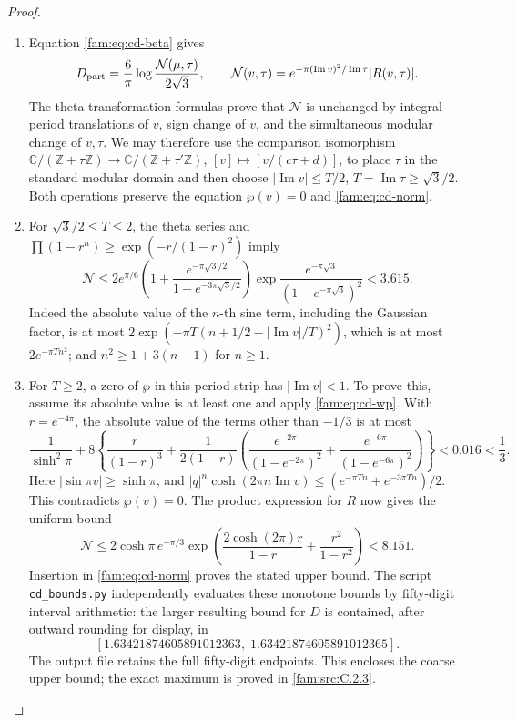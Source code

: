 \begin{proof}
\begin{enumerate}[label=\arabic*.,leftmargin=*]
\item Equation \eqref{fam:eq:cd-beta} gives
\begin{equation}\label{fam:eq:cd-norm}
 D_{\rm part}=\frac6\pi\log\frac{\mathcal N(\mu,\tau)}{2\sqrt3},
 \qquad
 \mathcal N(v,\tau)=e^{-\pi(\operatorname{Im}v)^2/\operatorname{Im}\tau}
 |R(v,\tau)|.
\end{equation}
The theta transformation formulas prove that \(\mathcal N\) is unchanged
by integral period translations of \(v\), sign change of \(v\), and the
simultaneous modular change of \(v,\tau\). We may therefore use the
comparison isomorphism \(\mathbb C/(\mathbb Z+\tau\mathbb Z)\to
\mathbb C/(\mathbb Z+\tau'\mathbb Z)\), \([v]\mapsto[v/(c\tau+d)]\), to
place \(\tau\) in the standard modular domain and then choose
\(|\operatorname{Im}v|\leq T/2\), \(T=\operatorname{Im}\tau\geq\sqrt3/2\).
Both operations preserve the equation \(\wp(v)=0\) and \eqref{fam:eq:cd-norm}.

\item For \(\sqrt3/2\leq T\leq2\), the theta series and
\(\prod(1-r^n)\geq\exp(-r/(1-r)^2)\) imply
\[
 \mathcal N\leq
 2e^{\pi/6}\left(1+\frac{e^{-\pi\sqrt3/2}}
 {1-e^{-3\pi\sqrt3/2}}\right)
 \exp\frac{e^{-\pi\sqrt3}}{(1-e^{-\pi\sqrt3})^2}
 <3.615.
\]
Indeed the absolute value of the \(n\)-th sine term, including the
Gaussian factor, is at most
\(2\exp(-\pi T(n+1/2-|\operatorname{Im}v|/T)^2)\), which is at most
\(2e^{-\pi Tn^2}\); and \(n^2\geq1+3(n-1)\) for \(n\geq1\).

\item For \(T\geq2\), a zero of \(\wp\) in this period strip has
\(|\operatorname{Im}v|<1\). To prove this, assume its absolute value is at
least one and apply \eqref{fam:eq:cd-wp}. With \(r=e^{-4\pi}\), the absolute
value of the terms other than \(-1/3\) is at most
\[
 \frac1{\sinh^2\pi}+8\left\{
 \frac r{(1-r)^3}+\frac1{2(1-r)}
 \left(\frac{e^{-2\pi}}{(1-e^{-2\pi})^2}
 +\frac{e^{-6\pi}}{(1-e^{-6\pi})^2}\right)\right\}<0.016<\frac13.
\]
Here \(|\sin\pi v|\geq\sinh\pi\), and
\(|q|^n\cosh(2\pi n\operatorname{Im}v)\leq
(e^{-\pi Tn}+e^{-3\pi Tn})/2\). This contradicts \(\wp(v)=0\).
The product expression for \(R\) now gives the uniform bound
\[
 \mathcal N\leq2\cosh\pi\,e^{-\pi/3}
 \exp\left(\frac{2\cosh(2\pi)r}{1-r}+\frac{r^2}{1-r^2}\right)
 <8.151.
\]
Insertion in \eqref{fam:eq:cd-norm} proves the stated upper bound. The script
\texttt{cd\_bounds.py} independently evaluates these monotone bounds by
fifty-digit interval arithmetic: the larger resulting bound for \(D\) is
contained, after outward rounding for display, in
\[
 [1.63421874605891012363,\;1.63421874605891012365].
\]
The output file retains the full fifty-digit endpoints.
This encloses the coarse upper bound; the exact maximum is proved in \ref{fam:src:C.2.3}.


\end{enumerate}
\end{proof}
